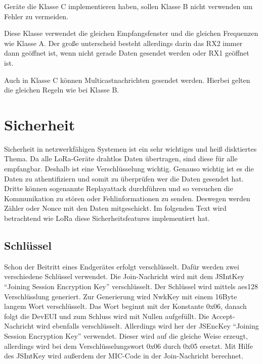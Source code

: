 \documentclass[a4paper, 12pt]{article}
\begin{document}
            Geräte die Klasse C implementieren haben, sollen Klasse B nicht verwenden um Fehler zu vermeiden.

            Diese Klasse verwendet die gleichen Empfangsfenster und die gleichen Frequenzen wie Klasse A. Der große 
            unterscheid besteht allerdings darin das RX2 immer dann geöffnet ist, wenn nicht gerade Daten gesendet 
            werden oder RX1 geöffnet ist. 

            Auch in Klasse C können Multicastnachrichten gesendet werden. Hierbei gelten die gleichen 
            Regeln wie bei Klasse B.

    \section{Sicherheit} \label{sec:Sicherheit}  
        Sicherheit in netzwerkfähigen Systemen ist ein sehr wichtiges und heiß disktiertes Thema. Da alle LoRa-Geräte 
        drahtlos Daten übertragen, sind diese für alle empfangbar. Deshalb ist eine Verschlüsselung wichtig.
        Genauso wichtig ist es die Daten zu athentifiziern und somit zu überprüfen wer die Daten gesendet hat. 
        Dritte können sogenannte Replayattack durchführen und so versuchen die Kommunikation zu stören oder 
        Fehlinformationen zu senden. Deswegen werden Zähler oder Nonce mit den Daten mitgeschickt. 
        Im folgenden Text wird betrachtend wie LoRa diese Sicherheitsfeatures implementiert hat.

        \subsection{Schlüssel}
            Schon der Beitritt eines Endgerätes erfolgt verschlüsselt. Dafür werden zwei verschiedene Schlüssel 
            verwendet. Die Join-Nachricht wird mit dem JSIntKey ``Joining Session Encryption Key'' verschlüsselt. Der 
            Schlüssel wird mittels aes128 Verschlüsslung generiert. 
            Zur Generierung wird NwkKey mit einem 16Byte langem Wort verschlüsselt. Das Wort beginnt 
            mit der Konstante 0x06, danach folgt die DevEUI und zum Schluss wird mit Nullen aufgefüllt. 
            Die Accept-Nachricht wird ebenfalls verschlüsselt. Allerdings wird 
            her der JSEncKey ``Joining Session Encryption Key'' verwendet. Dieser wird auf die gleiche Weise erzeugt, 
            allerdings wird bei dem Verschlüsselungswort 0x06 durch 0x05 ersetzt. 
            Mit Hilfe des JSIntKey wird außerdem der MIC-Code in der Join-Nachricht berechnet.
\end{document}
